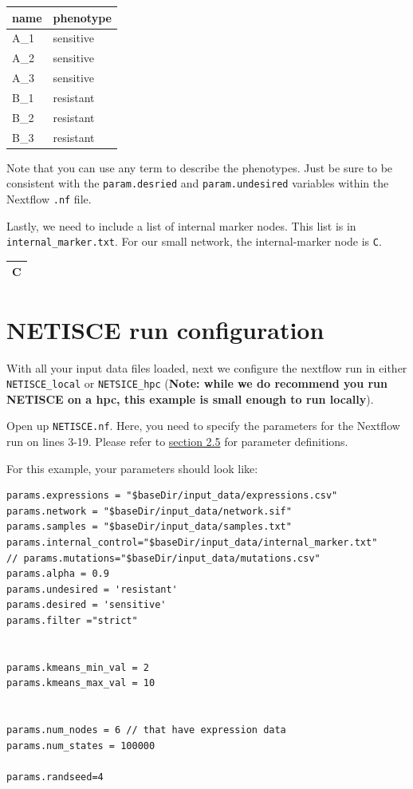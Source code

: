 \documentclass[
]{book}
\begin{document}
\begin{tabular}{l|l}
\hline
name & phenotype\\
\hline
A\_1 & sensitive\\
\hline
A\_2 & sensitive\\
\hline
A\_3 & sensitive\\
\hline
B\_1 & resistant\\
\hline
B\_2 & resistant\\
\hline
B\_3 & resistant\\
\hline
\end{tabular}

Note that you can use any term to describe the phenotypes. Just be sure to be consistent with the \texttt{param.desried} and \texttt{param.undesired} variables within the Nextflow \texttt{.nf} file.

Lastly, we need to include a list of internal marker nodes. This list is in \texttt{internal\_marker.txt}. For our small network, the internal-marker node is \texttt{C}.

\begin{tabular}{l}
\hline
C\\


\hline
\end{tabular}

\hypertarget{netisce-run-configuration}{%
\section{NETISCE run configuration}\label{netisce-run-configuration}}

With all your input data files loaded, next we configure the nextflow run in either \texttt{NETISCE\_local} or \texttt{NETSICE\_hpc} (\textbf{Note: while we do recommend you run NETISCE on a hpc, this example is small enough to run locally}).

Open up \texttt{NETISCE.nf}. Here, you need to specify the parameters for the Nextflow run on lines 3-19. Please refer to \protect\hyperlink{params}{section 2.5} for parameter definitions.

For this example, your parameters should look like:

\begin{verbatim}
params.expressions = "$baseDir/input_data/expressions.csv"
params.network = "$baseDir/input_data/network.sif"
params.samples = "$baseDir/input_data/samples.txt"
params.internal_control="$baseDir/input_data/internal_marker.txt"
// params.mutations="$baseDir/input_data/mutations.csv"
params.alpha = 0.9
params.undesired = 'resistant'
params.desired = 'sensitive'
params.filter ="strict"


params.kmeans_min_val = 2
params.kmeans_max_val = 10


params.num_nodes = 6 // that have expression data
params.num_states = 100000

params.randseed=4
\end{verbatim}
\end{document}
